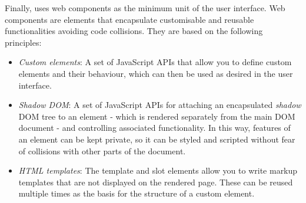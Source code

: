 Finally, \ork{} uses web components as the minimum unit of the user interface. Web components are elements that encapsulate customisable and reusable functionalities avoiding code collisions. They are based on the following principles:
\begin{itemize}
    \item \textit{Custom elements}: A set of JavaScript APIs that allow you to define custom elements and their behaviour, which can then be used as desired in the user interface.
    \item \textit{Shadow DOM}: A set of JavaScript APIs for attaching an encapsulated \textit{shadow} DOM tree to an element - which is rendered separately from the main DOM document - and controlling associated functionality. In this way, features of an element can be kept private, so it can be styled and scripted without fear of collisions with other parts of the document.
    \item \textit{HTML templates}: The template and slot elements allow you to write markup templates that are not displayed on the rendered page. These can be reused multiple times as the basis for the structure of a custom element.
\end{itemize}




